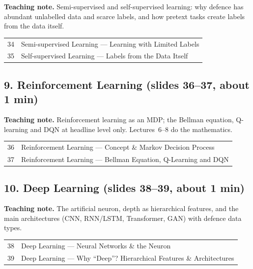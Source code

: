\documentclass[11pt]{article}
\begin{document}
\textbf{Teaching note.} Semi-supervised and self-supervised learning: why defence has abundant unlabelled data and scarce labels, and how pretext tasks create labels from the data itself.

\begin{center}\small\renewcommand{\arraystretch}{1.1}\begin{tabularx}{\textwidth}{@{}r X@{}}34 & Semi-supervised Learning --- Learning with Limited Labels\\
35 & Self-supervised Learning --- Labels from the Data Itself\\\end{tabularx}\end{center}

\subsection{9. Reinforcement Learning \normalfont\small\color{GreyN}(slides 36--37, about 1 min)}

\textbf{Teaching note.} Reinforcement learning as an MDP; the Bellman equation, Q-learning and DQN at headline level only. Lectures~6--8 do the mathematics.

\begin{center}\small\renewcommand{\arraystretch}{1.1}\begin{tabularx}{\textwidth}{@{}r X@{}}36 & Reinforcement Learning --- Concept \& Markov Decision Process\\
37 & Reinforcement Learning --- Bellman Equation, Q-Learning and DQN\\\end{tabularx}\end{center}

\subsection{10. Deep Learning \normalfont\small\color{GreyN}(slides 38--39, about 1 min)}

\textbf{Teaching note.} The artificial neuron, depth as hierarchical features, and the main architectures (CNN, RNN/LSTM, Transformer, GAN) with defence data types.

\begin{center}\small\renewcommand{\arraystretch}{1.1}\begin{tabularx}{\textwidth}{@{}r X@{}}38 & Deep Learning --- Neural Networks \& the Neuron\\
39 & Deep Learning --- Why ``Deep''? Hierarchical Features \& Architectures\\\end{tabularx}\end{center}
\end{document}
